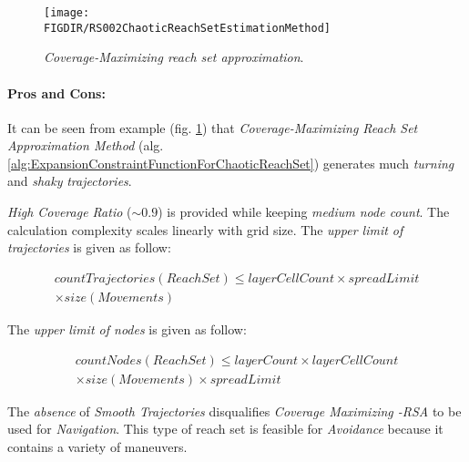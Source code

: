\begin{figure}[H]
    \centering
    \texttt{[image: \\FIGDIR/RS002ChaoticReachSetEstimationMethod]} 
    \caption{\emph{Coverage-Maximizing \emph{reach set} approximation}.}
    \label{fig:chaoticReachSetApproximation}
\end{figure}


\paragraph{Pros and Cons:} It can be seen from example (fig. \ref{fig:chaoticReachSetApproximation}) that \emph{Coverage-Maximizing Reach Set Approximation Method} (alg. \ref{alg:ExpansionConstraintFunctionForChaoticReachSet}) generates much \emph{turning} and \emph{shaky} \emph{trajectories}. 

\emph{High Coverage Ratio} ($\sim 0.9$) is provided while keeping \emph{medium node count}. The calculation complexity scales linearly with grid size. The \emph{upper limit of trajectories} is given as follow:

\begin{multline}
    countTrajectories(ReachSet) \le layerCellCount \times spreadLimit\\ \times size(Movements)
\end{multline}

\noindent The \emph{upper limit of nodes} is given as follow:
    
\begin{multline}
    countNodes(ReachSet) \le layerCount \times  layerCellCount  \\
    \times size(Movements) \times spreadLimit  
\end{multline}

\noindent The \emph{absence} of \emph{Smooth Trajectories} disqualifies \emph{Coverage Maximizing -RSA} to be used for \emph{Navigation}. This type of reach set is feasible for \emph{Avoidance} because it contains a variety of maneuvers.



